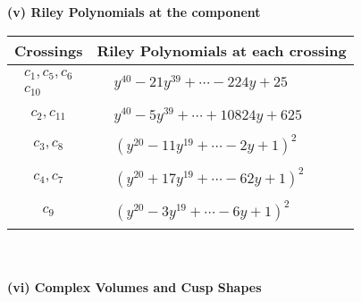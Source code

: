 \documentclass[1p]{elsarticle_modified}
\theoremstyle{definition}
\begin{document}
\flushleft \textbf{(v) Riley Polynomials at the component}\newline \\
\begin{tabular}{m{50pt}|m{274pt}}
Crossings & \hspace{64pt}Riley Polynomials at each crossing \\
\hline $$\begin{aligned}c_{1},c_{5},c_{6}\\c_{10}\end{aligned}$$&$\begin{aligned}
&y^{40}-21 y^{39}+\cdots-224 y+25
\end{aligned}$\\
\hline $$\begin{aligned}c_{2},c_{11}\end{aligned}$$&$\begin{aligned}
&y^{40}-5 y^{39}+\cdots+10824 y+625
\end{aligned}$\\
\hline $$\begin{aligned}c_{3},c_{8}\end{aligned}$$&$\begin{aligned}
&(y^{20}-11 y^{19}+\cdots-2 y+1)^{2}
\end{aligned}$\\
\hline $$\begin{aligned}c_{4},c_{7}\end{aligned}$$&$\begin{aligned}
&(y^{20}+17 y^{19}+\cdots-62 y+1)^{2}
\end{aligned}$\\
\hline $$\begin{aligned}c_{9}\end{aligned}$$&$\begin{aligned}
&(y^{20}-3 y^{19}+\cdots-6 y+1)^{2}
\end{aligned}$\\
\hline
\end{tabular}\\~\\
\newpage\flushleft \textbf{(vi) Complex Volumes and Cusp Shapes}
\end{document}
